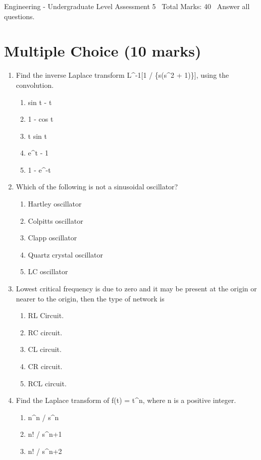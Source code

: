 \documentclass[12pt]{article}
\begin{document}
\begin{center}
Engineering - Undergraduate Level Assessment 5 \
Total Marks: 40 \
Answer all questions.
\end{center}

\section*{Multiple Choice (10 marks)}
\begin{enumerate}[label=\arabic*.]
\item Find the inverse Laplace transform L\^{}-1[1 / \{s(s\^{}2 + 1)\}], using the convolution.
\begin{enumerate}[label=(\alph*)]
    \item sin t - t
    \item 1 - cos t
    \item t sin t
    \item e\^{}t - 1
    \item 1 - e\^{}-t
\end{enumerate}
\item Which of the following is not a sinusoidal oscillator?
\begin{enumerate}[label=(\alph*)]
    \item Hartley oscillator
    \item Colpitts oscillator
    \item Clapp oscillator
    \item Quartz crystal oscillator
    \item LC oscillator
\end{enumerate}
\item Lowest critical frequency is due to zero and it may be present at the origin or nearer to
the origin, then the type of network is
\begin{enumerate}[label=(\alph*)]
    \item RL Circuit.
    \item RC circuit.
    \item CL circuit.
    \item CR circuit.
    \item RCL circuit.
\end{enumerate}
\item Find the Laplace transform of f(t) = t\^{}n, where n is a positive integer.
\begin{enumerate}[label=(\alph*)]
    \item n\^{}n / s\^{}n
    \item n! / s\^{}n+1
    \item n! / s\^{}n+2

\end{enumerate}
\end{enumerate}
\end{document}
